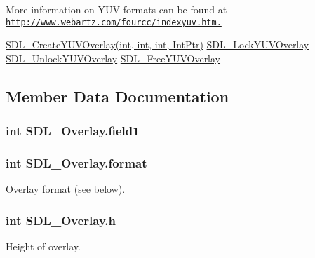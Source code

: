 More information on YUV formats can be found at \href{http://www.webartz.com/fourcc/indexyuv.htm.}{\tt http://www.webartz.com/fourcc/indexyuv.htm.}

\hyperlink{_sdl_8cs_a433c9c002d6c6a4a3077fc12ff790372}{SDL\_\-CreateYUVOverlay(int, int, int, IntPtr)} \hyperlink{_sdl_8cs_aef75e3a4590a542c940f024fa387031d}{SDL\_\-LockYUVOverlay} \hyperlink{_sdl_8cs_a593554f2e6f34c6fed0c39295884b85d}{SDL\_\-UnlockYUVOverlay} \hyperlink{_sdl_8cs_a5152023ef4588c85f5190e5a067527bc}{SDL\_\-FreeYUVOverlay} 

\subsection{Member Data Documentation}
\hypertarget{struct_s_d_l___overlay_a8b4fcc8ef6d876747e39c25631f4778a}{
\subsubsection[{field1}]{\setlength{\rightskip}{0pt plus 5cm}int {\bf SDL\_\-Overlay.field1}}}
\label{struct_s_d_l___overlay_a8b4fcc8ef6d876747e39c25631f4778a}
\hypertarget{struct_s_d_l___overlay_a9d5fe04787193aff557a6c7b85d2c96b}{
\subsubsection[{format}]{\setlength{\rightskip}{0pt plus 5cm}int {\bf SDL\_\-Overlay.format}}}
\label{struct_s_d_l___overlay_a9d5fe04787193aff557a6c7b85d2c96b}


Overlay format (see below). 

\hypertarget{struct_s_d_l___overlay_a86a1db38b124d4c565a798de82f2fa22}{
\subsubsection[{h}]{\setlength{\rightskip}{0pt plus 5cm}int {\bf SDL\_\-Overlay.h}}}
\label{struct_s_d_l___overlay_a86a1db38b124d4c565a798de82f2fa22}


Height of overlay. 

